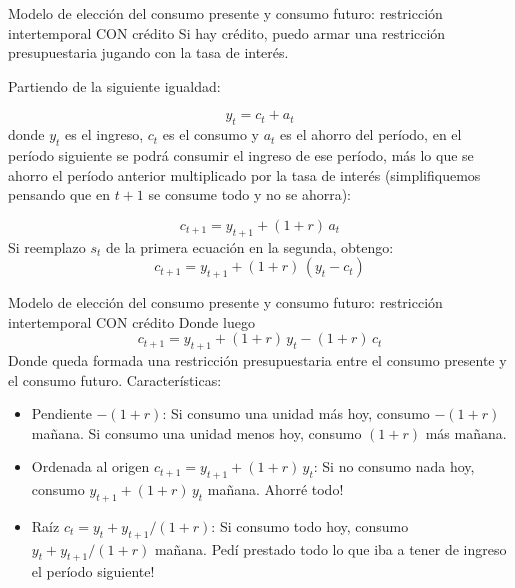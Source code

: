 \documentclass{beamer}
\begin{document}
\begin{frame}{Modelo de elección del consumo presente y consumo futuro: restricción intertemporal CON crédito}
    Si hay crédito, puedo armar una restricción presupuestaria jugando con la tasa de interés.

    Partiendo de la siguiente igualdad:

    \[y_t = c_t + a_t\]
    donde \(y_t\) es el ingreso, \(c_t\) es el consumo y \(a_t\) es el ahorro del período, en el período siguiente se podrá consumir el ingreso de ese período, más lo que se ahorro el período anterior multiplicado por la tasa de interés (simplifiquemos pensando que en $t+1$ se consume todo y no se ahorra):

    \[c_{t+1} = y_{t+1} + (1+r)\,a_t\]
    Si reemplazo $s_t$ de la primera ecuación en la segunda, obtengo:
    \[c_{t+1} = y_{t+1} + (1+r)\,(y_t - c_t)\]
\end{frame}

\begin{frame}{Modelo de elección del consumo presente y consumo futuro: restricción intertemporal CON crédito}
    Donde luego
    \[c_{t+1} = y_{t+1} + (1+r)\,y_t - (1+r)\,c_t\]
    Donde queda formada una restricción presupuestaria entre el consumo presente y el consumo futuro. Características:
    \begin{itemize}
        \item Pendiente $-(1+r)$: Si consumo una unidad más hoy, consumo $-(1+r)$ mañana. Si consumo una unidad menos hoy, consumo $(1+r)$ más mañana.
        \item Ordenada al origen $c_{t+1} = y_{t+1} + (1+r)\,y_t$: Si no consumo nada hoy, consumo $y_{t+1} + (1+r)\,y_t$ mañana. Ahorré todo!
        \item Raíz $c_t = y_t + y_{t+1}/(1+r)$: Si consumo todo hoy, consumo $y_t + y_{t+1}/(1+r)$ mañana. Pedí prestado todo lo que iba a tener de ingreso el período siguiente!
    \end{itemize}
\end{frame}
\end{document}
